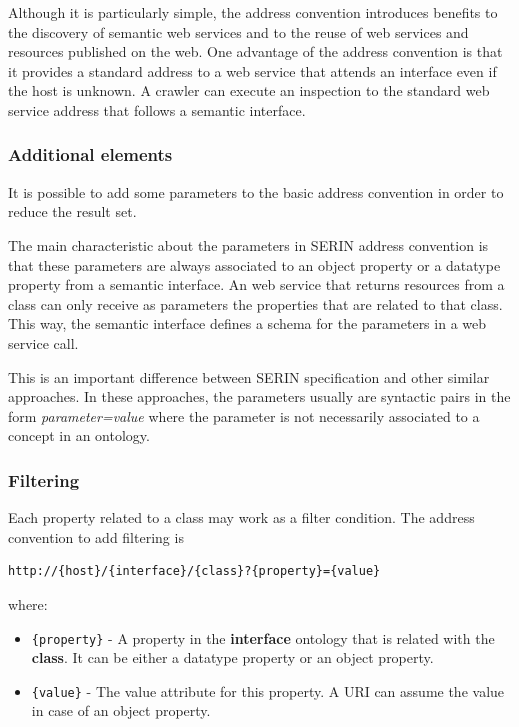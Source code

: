 \documentclass{singlecol-new}
\theoremstyle{TH}{
\newtheorem{lemma}{Lemma}
\newtheorem{theorem}[lemma]{Theorem}
\newtheorem{corrolary}[lemma]{Corrolary}
\newtheorem{conjecture}[lemma]{Conjecture}
\newtheorem{proposition}[lemma]{Proposition}
\newtheorem{claim}[lemma]{Claim}
\newtheorem{stheorem}[lemma]{Wrong Theorem}
\newtheorem{algorithm}{Algorithm}
}
\theoremstyle{THrm}{
\newtheorem{definition}{Definition}[section]
\newtheorem{question}{Question}[section]
\newtheorem{remark}{Remark}
\newtheorem{scheme}{Scheme}
}
\theoremstyle{THhit}{
\newtheorem{case}{Case}[section]
}
\begin{document}

Although it is particularly simple, the address convention introduces benefits to the discovery of semantic web services and to the reuse of web services and resources published on the web. 
One advantage of the address convention is that it provides a standard address to a web service that attends an interface even if the host is unknown. 
A crawler can execute an inspection to the standard web service address that follows a semantic interface. 

\subsubsection{Additional elements}
\label{sec:addressaddtional}
It is possible to add some parameters to the basic address convention in order to reduce the result set. 

The main characteristic about the parameters in SERIN address convention is that these parameters are always associated to an object property or a datatype property from a semantic interface. 
An web service that returns resources from a class can only receive as parameters the properties that are related to that class.  
This way, the semantic interface defines a schema for the parameters in a web service call.    

This is an important difference between SERIN specification and other similar approaches. 
In these approaches, the parameters usually are syntactic pairs in the form \textit{parameter=value} where the parameter is not necessarily associated to a concept in an ontology.  

\subsubsection{Filtering}
\label{sec:filtering}
Each property related to a class may work as a filter condition. The address convention to add filtering is 

\begin{lstlisting}[frame=single, basicstyle=\small\ttfamily]
http://{host}/{interface}/{class}?{property}={value}
\end{lstlisting}

where:

\begin{itemize}
	\item \texttt{\{property\}} - A property in the \textbf{{interface}} ontology that is related with the \textbf{{class}}. It can be either a datatype property or an object property.
	\item \texttt{\{value\}} - The value attribute for this property. A URI can assume the value in case of an object property.
\end{itemize}
\end{document}
